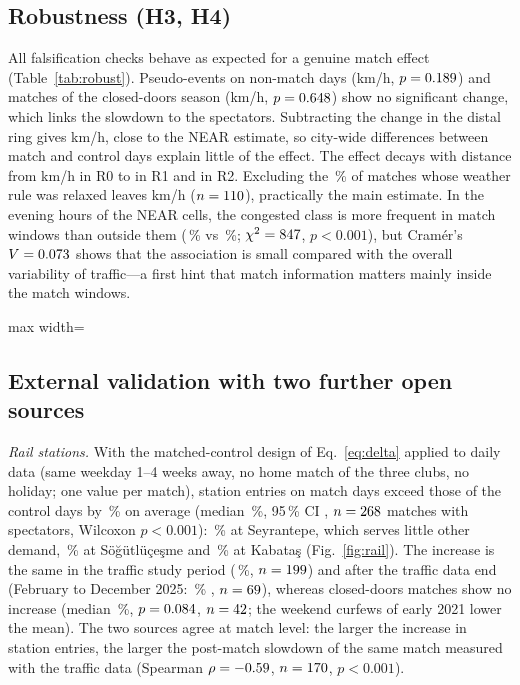 \documentclass[conference]{IEEEtran}
\newcommand{\fitcol}[1]{\begin{adjustbox}{max width=\columnwidth}#1\end{adjustbox}}
\begin{document}
\subsection{Robustness (H3, H4)}
All falsification checks behave as expected for a genuine match effect (Table~\ref{tab:robust}). Pseudo-events on non-match days (\vPlacebo km/h, $p=0.189$) and matches of the closed-doors season (\vClosedDoors km/h, $p=0.648$) show no significant change, which links the slowdown to the spectators. Subtracting the change in the distal ring gives \vDiD km/h, close to the NEAR estimate, so city-wide differences between match and control days explain little of the effect. The effect decays with distance from \vRingZero km/h in R0 to \vRingOne in R1 and \vRingTwo in R2. Excluding the \vPctRelaxed\,\% of matches whose weather rule was relaxed leaves \vSensMean km/h \vSensCI ($n=110$), practically the main estimate. In the evening hours of the NEAR cells, the congested class is more frequent in match windows than outside them (\vCongWin\,\% vs \vCongOther\,\%; $\chi^2=847$, $p<0.001$), but Cramér's $V=0.073$ shows that the association is small compared with the overall variability of traffic---a first hint that match information matters mainly inside the match windows.

\begin{table}[t]
\caption{Robustness and sensitivity checks, post-match window}
\label{tab:robust}
\centering\footnotesize
\fitcol{}
\end{table}

\subsection{External validation with two further open sources}
\label{sec:external}
\textit{Rail stations.} With the matched-control design of Eq.~\eqref{eq:delta} applied to daily data (same weekday 1--4 weeks away, no home match of the three clubs, no holiday; one value per match), station entries on match days exceed those of the control days by \vExtRailMean\,\% on average (median \vExtRailMedian\,\%, 95\,\% CI \vExtRailCI, $n=268$ matches with spectators, Wilcoxon $p<0.001$): \vExtRailRams\,\% at Seyrantepe, which serves little other demand, \vExtRailSar\,\% at Sö\u{g}ütlüçe\c{s}me and \vExtRailTup\,\% at Kabata\c{s} (Fig.~\ref{fig:rail}). The increase is the same in the traffic study period (\vExtRailStudy\,\%, $n=199$) and after the traffic data end (February to December 2025: \vExtRailAfter\,\% \vExtRailAfterCI, $n=69$), whereas closed-doors matches show no increase (median \vExtRailClosedMed\,\%, $p=0.084$, $n=42$; the weekend curfews of early 2021 lower the mean). The two sources agree at match level: the larger the increase in station entries, the larger the post-match slowdown of the same match measured with the traffic data (Spearman $\rho=-0.59$, $n=170$, $p<0.001$).
\end{document}
